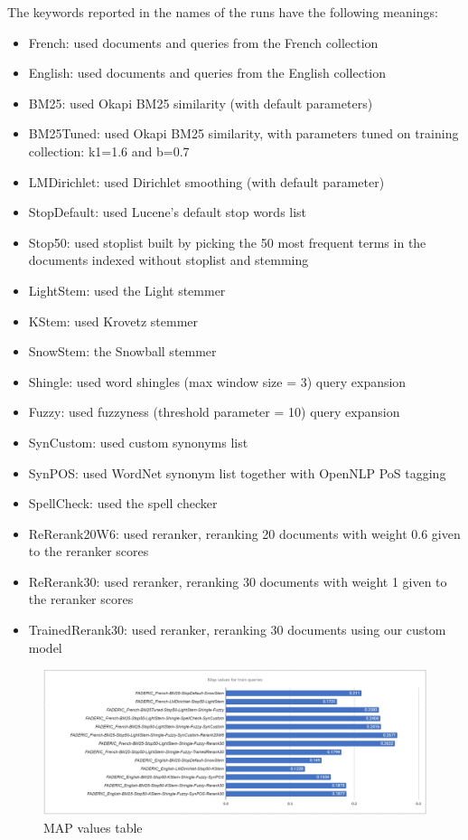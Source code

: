 The keywords reported in the names of the runs have the following meanings:
\begin{itemize}
	\item French: used documents and queries from the French collection
	\item English: used documents and queries from the English collection
	\item BM25: used Okapi BM25 similarity (with default parameters)
	\item BM25Tuned: used Okapi BM25 similarity, with parameters tuned on training collection: k1=1.6 and b=0.7
	\item LMDirichlet: used Dirichlet smoothing (with default parameter)
	\item StopDefault: used Lucene's default stop words list
	\item Stop50: used stoplist built by picking the 50 most frequent terms in the documents indexed without stoplist and stemming
	\item LightStem: used the Light stemmer
	\item KStem: used Krovetz stemmer
	\item SnowStem: the Snowball stemmer
	\item Shingle: used word shingles (max window size = 3) query expansion
	\item Fuzzy: used fuzzyness (threshold parameter = 10) query expansion
	\item SynCustom: used custom synonyms list
	\item SynPOS: used WordNet synonym list together with OpenNLP PoS tagging
	\item SpellCheck: used the spell checker
	\item ReRerank20W6: used reranker, reranking 20 documents with weight 0.6 given to the reranker scores
	\item ReRerank30: used reranker, reranking 30 documents with weight 1 given to the reranker scores
	\item TrainedRerank30: used reranker, reranking 30 documents using our custom model
\end{itemize}

\FloatBarrier

\begin{figure}[!h]
  \centering
  \includegraphics[width=1\linewidth]{figure/map-values.jpg}
  \caption{\ac{MAP} values table}
  \label{fig:map-values}
\end{figure}


